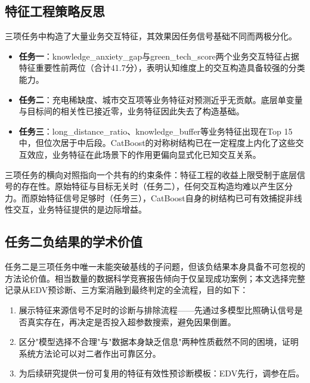 \subsection{特征工程策略反思}

三项任务中构造了大量业务交互特征，其效果因任务信号基础不同而两极分化。

\begin{itemize}[itemsep=0pt]
\item \textbf{任务一}：knowledge\_anxiety\_gap与green\_tech\_score两个业务交互特征占据特征重要性前两位（合计41.7分），表明认知维度上的交互构造具备较强的分类能力。
\item \textbf{任务二}：充电稀缺度、城市交互项等业务特征对预测近乎无贡献。底层单变量与目标间的相关性已接近零，业务特征因此失去了构造基础。
\item \textbf{任务三}：long\_distance\_ratio、knowledge\_buffer等业务特征出现在Top 15中，但位次居于中后段。CatBoost的对称树结构已在一定程度上内化了这些交互效应，业务特征在此场景下的作用更偏向显式化已知交互关系。
\end{itemize}

三项任务的横向对照指向一个共有的约束条件：特征工程的收益上限受制于底层信号的存在性。原始特征与目标无关时（任务二），任何交互构造均难以产生区分力。而原始特征信号足够时（任务三），CatBoost自身的树结构已可有效捕捉非线性交互，业务特征提供的是边际增益。

\subsection{任务二负结果的学术价值}

任务二是三项任务中唯一未能突破基线的子问题，但该负结果本身具备不可忽视的方法论价值。相当数量的数据科学竞赛报告倾向于仅呈现成功案例；本文选择完整记录从EDV预诊断、三方案消融到最终判定的全流程，目的如下：

\begin{enumerate}[itemsep=0pt]
\item 展示特征来源信号不足时的诊断与排除流程——先通过多模型比照确认信号是否真实存在，再决定是否投入超参数搜索，避免因果倒置。
\item 区分"模型选择不合理"与"数据本身缺乏信息"两种性质截然不同的困境，证明系统方法论可以对二者作出可靠区分。
\item 为后续研究提供一份可复用的特征有效性预诊断模板：EDV先行，调参在后。
\end{enumerate}
